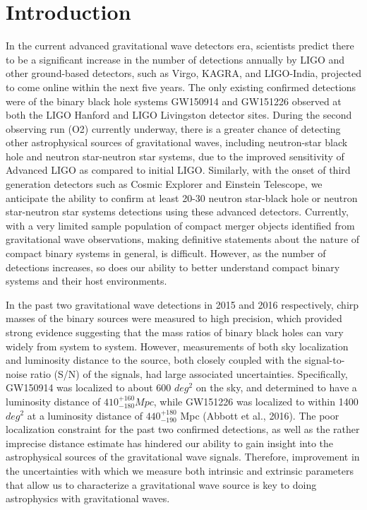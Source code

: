 \documentclass{article}
\begin{document}
\section{Introduction}

In the current advanced gravitational wave detectors era, scientists predict there to be a significant increase in the number of detections annually by LIGO and other ground-based detectors, such as Virgo, KAGRA, and LIGO-India, projected to come online within the next five years.  The only existing confirmed detections were of the binary black hole systems GW150914 and GW151226 observed at both the LIGO Hanford and LIGO Livingston detector sites.  During the second observing run (O2) currently underway, there is a greater chance of detecting other astrophysical sources of gravitational waves, including neutron-star black hole and neutron star-neutron star systems, due to the improved sensitivity of Advanced LIGO as compared to initial LIGO.  Similarly, with the onset of third generation detectors such as Cosmic Explorer and Einstein Telescope, we anticipate the ability to confirm at least 20-30 neutron star-black hole or neutron star-neutron star systems detections using these advanced detectors.  Currently, with a very limited sample population of compact merger objects identified from gravitational wave observations, making definitive statements about the nature of compact binary systems in general,  is difficult.  However, as the number of detections increases, so does our ability to better understand compact binary systems and their host environments.

In the past two gravitational wave detections in 2015 and 2016 respectively, chirp masses of the binary sources were measured to high precision, which provided strong evidence suggesting that the mass ratios of binary black holes can vary widely from system to system.  However, measurements of both sky localization and luminosity distance to the source, both closely coupled with the signal-to-noise ratio (S/N) of the signals, had large associated uncertainties.  Specifically, GW150914 was localized to about 600 $deg^2$ on the sky, and determined to have a luminosity distance of $410^{+160}_{-180} Mpc$, while GW151226 was localized to within 1400 $deg^{2}$ at a luminosity distance of $440^{+180}_{-190}$ Mpc (Abbott et al., 2016).  The poor localization constraint for the past two confirmed detections, as well as the rather imprecise distance estimate has hindered our ability to gain insight into the astrophysical sources of the gravitational wave signals.  Therefore, improvement in the uncertainties with which we measure both intrinsic and extrinsic parameters that allow us to characterize a gravitational wave source is key to doing astrophysics with gravitational waves.      
 
\end{document}

